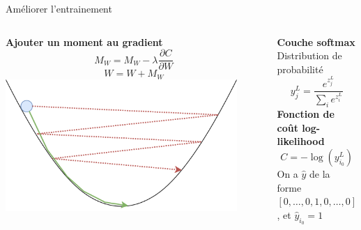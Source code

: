 \documentclass[10pt,xcolor={x11names}]{beamer}
\newcommand{\sectitle}[1]{{\large\color{titleblue}\textbf{#1}\\\smallskip}}
\begin{document}
\begin{frame}{Améliorer l'entrainement}
	\begin{columns}[T]
		\sectitle{Ajouter un moment au gradient}
		$$
		M_W=M_W - \lambda \frac{\partial C}{\partial W}
		$$
		$$
		W=W + M_W
		$$
		{\centering \includegraphics[width=0.9\textwidth]{gradient.png}}
		
		\sectitle{Couche softmax}
		Distribution de probabilité
		$$
		y^L_j=\frac{e^{z_j^L}}{\sum_i e^{z_i^L}}
		$$
		\medskip
		\textbf{Fonction de coût log-likelihood}
		$$
		C=-\log(y^L_{i_0})
		$$
		On a $\hat{y}$ de la forme $[0,\dots,0,1,0,\dots,0]$, et $\hat{y}_{i_0}=1$
		
	\end{columns}
\end{frame}
\end{document}
